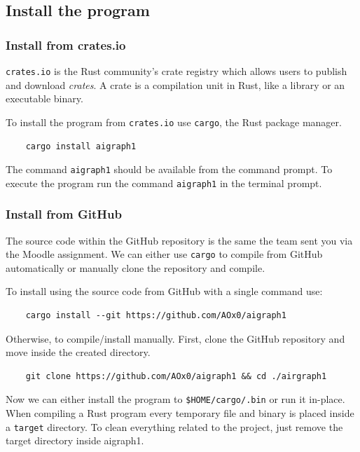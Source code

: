 \subsection{Install the program}

\subsubsection{Install from crates.io}

\texttt{crates.io} is the Rust community’s crate registry which allows users to publish and download \textit{crates}.
A crate is a compilation unit in Rust, like a library or an executable binary.

To install the program from \texttt{crates.io} use \texttt{cargo}, the Rust package manager.

\begin{verbatim}
    cargo install aigraph1
\end{verbatim}

The command \texttt{aigraph1} should be available from the command prompt.
To execute the program run the command \texttt{aigraph1} in the terminal prompt.

\subsubsection{Install from GitHub}

The source code within the GitHub repository is the same the team sent you via the Moodle assignment.
We can either use \texttt{cargo} to compile from GitHub automatically or manually clone the repository and
compile.

To install using the source code from GitHub with a single command use:
\begin{verbatim}
    cargo install --git https://github.com/AOx0/aigraph1
\end{verbatim}

Otherwise, to compile/install manually. First, clone the GitHub repository and move inside the created directory.

\begin{verbatim}
    git clone https://github.com/AOx0/aigraph1 && cd ./airgraph1
\end{verbatim}

Now we can either install the program to \texttt{\$HOME/cargo/.bin} or run it in-place. When compiling a
Rust program every temporary file and binary is placed inside a \texttt{target} directory. To clean everything
related to the project, just remove the target directory inside aigraph1.

